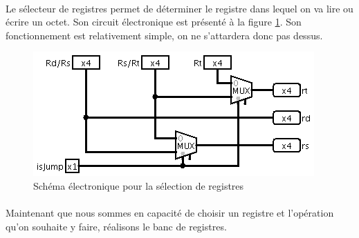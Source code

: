 \paragraph{}{
	Le sélecteur de registres permet de déterminer le registre
	dans lequel on va lire ou écrire un octet. Son circuit électronique
	est présenté à la figure \ref{selec_reg_circ}.
	Son fonctionnement est relativement simple, on ne s’attardera donc
	pas dessus.
}

\begin{figure}[!h]
	\centering
	\includegraphics[scale=0.8,origin=c]{circuits/selec_reg.png}
	\caption{
		\label{selec_reg_circ}
		Sch\'{e}ma \'{e}lectronique pour la s\'{e}lection de registres
	}
\end{figure}

\paragraph{}{
	Maintenant que nous sommes en capacité de choisir un registre
	et l'opération qu'on souhaite y faire, réalisons le banc de
	registres.
}